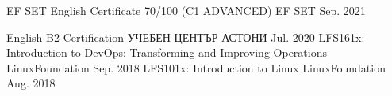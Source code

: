 

\begin{cvhonors}

  \cvhonor
    {EF SET English Certificate 70/100 (C1 ADVANCED)} %
    {EF SET} %
    {} %
    {Sep. 2021} %

  \cvhonor
    {English B2 Certification} %
    {УЧЕБЕН ЦЕНТЪР АСТОНИ} %
    {} %
    {Jul. 2020} %
  \cvhonor
    {LFS161x: Introduction to DevOps: Transforming and Improving Operations} %
    {LinuxFoundation} %
    {} %
    {Sep. 2018} %
  \cvhonor
    {LFS101x: Introduction to Linux} %
    {LinuxFoundation} %
    {} %
    {Aug. 2018} %
\end{cvhonors}
